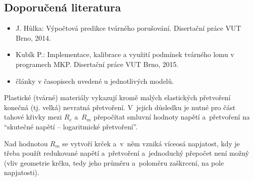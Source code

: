 
\subsection{Doporučená literatura}
\begin{itemize}
	\item J. Hůlka: Výpočtová predikce tvárného porušování. Disertační práce VUT Brno, 2014.
	\item Kubík P.: Implementace, kalibrace a využití podmínek tvárného lomu v programech MKP. Disertační práce VUT Brno, 2015.
	\item články v časopisech uvedené u jednotlivých modelů.
\end{itemize}

Plastické (tvárné) materiály vykazují kromě malých elastických přetvoření konečná (tj. velká) nevratná přetvoření. V~jejich důsledku je nutné pro část tahové křivky mezi $R_e$ a~$R_m$ přepočítat smluvní hodnoty napětí a~přetvoření na \enquote{skutečné napětí -- logaritmické přetvoření}.

Nad hodnotou $R_m$ se vytvoří krček a~v~něm vzniká víceosá napjatost, kdy je třeba použít redukované napětí a~přetvoření a~jednoduchý přepočet není možný (vliv geometrie krčku, tedy jeho průměru a~poloměru zaškrcení, na pole napjatosti).

